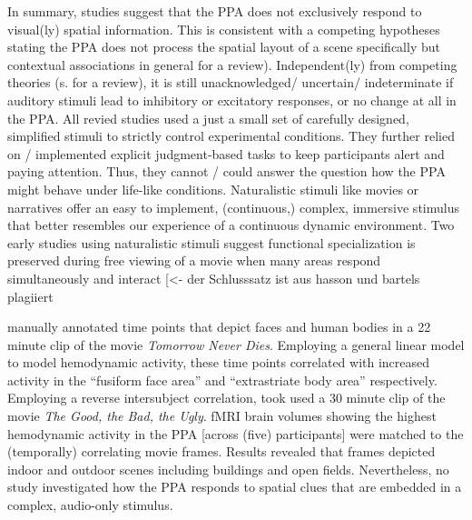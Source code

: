 \documentclass[english]{article}
\begin{document}
In summary, studies suggest that the PPA does not exclusively respond to visual(ly) spatial information. This is consistent with a competing hypotheses stating the PPA does not process the spatial layout of a scene specifically but contextual associations in general \citep{aminoff2006parahippocampal} for a review). Independent(ly) from competing theories (s. \citep{aminoff2013role} for a review), it is still unacknowledged/ uncertain/ indeterminate if auditory stimuli lead to inhibitory or excitatory responses, or no change at all in the PPA.
All revied studies used a just a small set of carefully designed, simplified stimuli to strictly control experimental conditions. They further relied on / implemented explicit judgment-based tasks to keep participants alert and paying attention. Thus, they cannot / could answer the question how the PPA might behave under life-like conditions.
Naturalistic stimuli like movies \citep{hasson2008neurocinematics, sonkusare2019naturalistic} or narratives \citep{honey2012not, lerner2011topographic, silbert2014coupled} offer an easy to implement, (continuous,) complex, immersive stimulus that better resembles our experience of a continuous dynamic environment.
Two early studies using naturalistic stimuli suggest functional specialization is preserved during free viewing of a movie when many areas respond simultaneously and interact [<- der Schlusssatz ist aus hasson und bartels plagiiert \citep{bartels2004mapping, hasson2004intersubject}

\citep{bartels2004mapping} manually annotated time points that depict faces and human bodies in a 22 minute clip of the movie \textit{Tomorrow Never Dies}.
Employing a general linear model to model hemodynamic activity, these time points correlated with increased activity in the ``fusiform face area'' \citep{kanwisher1997ffa} and ``extrastriate body area'' \citep{downing2001bodyarea} respectively. Employing a reverse intersubject correlation, \citep{hasson2004intersubject} took used a 30 minute clip of the movie \textit{The Good, the Bad, the Ugly}.
fMRI brain volumes showing the highest hemodynamic activity in the PPA [across (five) participants] were matched to the (temporally) correlating movie frames.
Results revealed that frames depicted indoor and outdoor scenes including buildings and open fields.
Nevertheless, no study investigated how the PPA responds to spatial clues that are embedded in a complex, audio-only stimulus.
\end{document}
